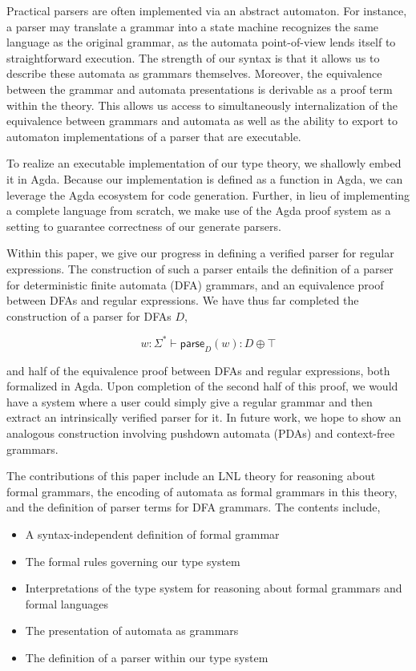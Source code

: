 \documentclass[acmsmall,screen,nonacm]{acmart}
\newcommand{\String}{\Sigma^{*}}
\begin{document}
Practical parsers are often implemented via an abstract automaton. For instance,
a parser may translate a grammar into a state machine recognizes the
same language as the original grammar, as the automata
point-of-view lends itself to straightforward execution. The
strength of our syntax is that it allows us to describe
these automata as grammars themselves. Moreover, the
equivalence between the grammar and automata presentations
is derivable as a proof term within the theory. This allows
us access to simultaneously internalization of the equivalence
between grammars and automata as well as the ability to
export to automaton implementations of a parser that are executable.

To realize an executable implementation of our type theory,
we shallowly embed it in Agda. Because our implementation is
defined as a function in Agda, we can leverage the Agda
ecosystem for code generation. Further, in lieu of
implementing a complete language from scratch, we make use of the
Agda proof system as a setting to guarantee correctness of
our generate parsers.

Within this paper, we give our progress in defining a verified
parser for regular expressions. The construction of such a parser entails
the definition of a parser for deterministic finite automata (DFA) grammars,
and an equivalence proof between DFAs and regular expressions. We have thus far
completed the construction of a parser for DFAs $D$,

\[
  w : \String \vdash \mathsf{parse}_{D}(w) : D \oplus \top
\]

and half of the equivalence proof between DFAs and regular expressions, both
formalized in Agda. Upon completion of the second half of this proof, we would
have a system where a user could simply give a regular grammar and then extract
an intrinsically verified parser for it. In future work, we
hope to show an analogous construction involving pushdown
automata (PDAs) and context-free grammars.

The contributions of this paper include an LNL theory for reasoning about formal
grammars, the encoding of automata as formal grammars in this theory, and the
definition of parser terms for DFA grammars. The contents include,

\begin{itemize}
  \item A syntax-independent definition of formal grammar
  \item The formal rules governing our type system
  \item Interpretations of the type system for reasoning about formal grammars
        and formal languages
  \item The presentation of automata as grammars
  \item The definition of a parser within our type system
\end{itemize}
\end{document}
